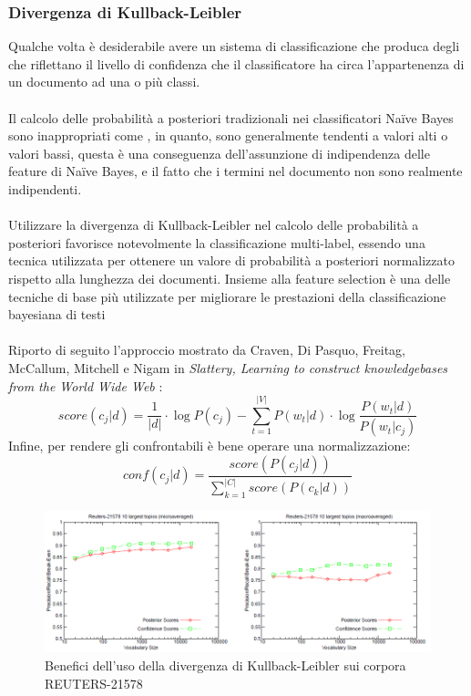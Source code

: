 \documentclass{article}
\theoremstyle{plain}
\theoremstyle{definition}
\begin{document}
\subsubsection{Divergenza di Kullback-Leibler}
Qualche volta è desiderabile avere un sistema di classificazione che produca degli  che riflettano il livello di confidenza che il classificatore ha circa l'appartenenza di un documento ad una o più classi.
\\
\\
Il calcolo delle probabilità a posteriori tradizionali nei classificatori Naïve Bayes sono inappropriati come , in quanto, sono generalmente tendenti a valori alti o valori bassi, questa è una conseguenza dell'assunzione di indipendenza delle feature di Naïve Bayes, e il fatto che i termini nel documento non sono realmente indipendenti.
\\
\\
Utilizzare la divergenza di Kullback-Leibler nel calcolo delle probabilità a posteriori favorisce notevolmente la classificazione multi-label, essendo una tecnica utilizzata per ottenere un valore di probabilità a posteriori normalizzato rispetto alla lunghezza dei documenti. Insieme alla feature selection è una delle tecniche di base più utilizzate per migliorare le prestazioni della classificazione bayesiana di testi\footnotemark
{}
\\
\\
Riporto di seguito l'approccio mostrato da Craven, Di Pasquo, Freitag, McCallum, Mitchell e Nigam in \textit{Slattery, Learning to construct knowledgebases from the World Wide Web}
\footnotemark
{}:
$$score(c_j|d) =\frac{1}{|d|} \cdot \log P(c_j) - \sum_{t=1}^{|V|} P(w_t|d) \cdot \log \frac{P(w_t|d)}{P(w_t|c_j)} $$
Infine, per rendere gli  confrontabili è bene operare una normalizzazione:
$$conf(c_j|d)=\frac{score(P(c_j|d))}{\sum_{k=1}^{|C|} score(P(c_k|d))}$$
\begin{figure}[htbp]
\begin{center}
\includegraphics[scale=0.80]{img/klbenefits.png}
\caption{Benefici dell'uso della divergenza di Kullback-Leibler sui corpora REUTERS-21578}
\end{center}
\end{figure}
\end{document}
